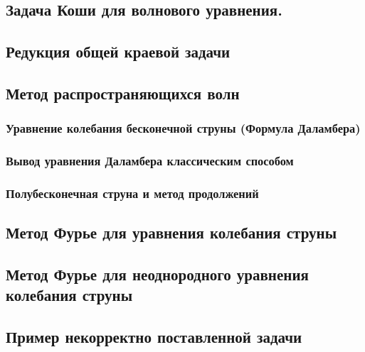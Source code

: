 \documentclass[12pt, a4paper]{article}
\begin{document}
	\subsection{Задача Коши для волнового уравнения.}	\label{que:8}
		 \newpage

	\subsection{Редукция общей краевой задачи}\label{que:12}
		\newpage

	\subsection{Метод распространяющихся волн}
		\subsubsection{Уравнение колебания бесконечной струны (Формула Даламбера)}
			 \newpage	

		\subsubsection{Вывод уравнения Даламбера классическим способом}
			 \newpage

		\subsubsection{Полубесконечная струна и метод продолжений}\label{que:9}
			\newpage


	\subsection{Метод Фурье для уравнения колебания струны} \label{que:10}
		 \newpage

	\subsection{Метод Фурье для неоднородного уравнения колебания струны} \label{que:11}
		 \newpage

	\subsection{Пример некорректно поставленной задачи}
		\newpage
\end{document}
